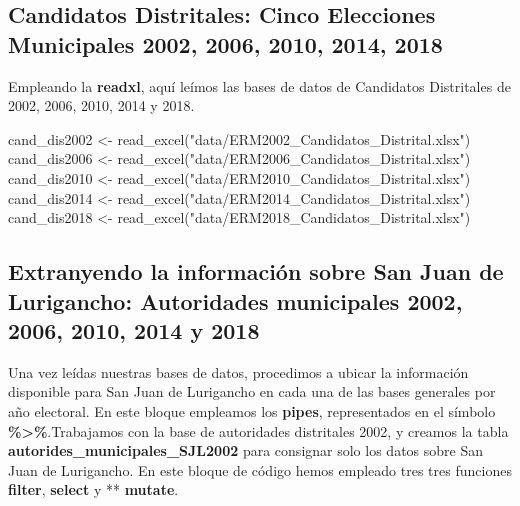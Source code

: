 \documentclass[
]{book}
\newenvironment{Shaded}{\begin{snugshade}}{\end{snugshade}}
\newcommand{\FunctionTok}[1]{\textcolor[rgb]{0.00,0.00,0.00}{#1}}
\newcommand{\NormalTok}[1]{#1}
\newcommand{\OtherTok}[1]{\textcolor[rgb]{0.56,0.35,0.01}{#1}}
\newcommand{\StringTok}[1]{\textcolor[rgb]{0.31,0.60,0.02}{#1}}
\begin{document}
\hypertarget{candidatos-distritales-cinco-elecciones-municipales-2002-2006-2010-2014-2018}{%
\subsection{Candidatos Distritales: Cinco Elecciones Municipales 2002, 2006, 2010, 2014, 2018}\label{candidatos-distritales-cinco-elecciones-municipales-2002-2006-2010-2014-2018}}

Empleando la \textbf{readxl}, aquí leímos las bases de datos de Candidatos Distritales de 2002, 2006, 2010, 2014 y 2018.

\begin{Shaded}
\begin{Highlighting}[]
\NormalTok{cand\_dis2002 }\OtherTok{\textless{}{-}} \FunctionTok{read\_excel}\NormalTok{(}\StringTok{"data/ERM2002\_Candidatos\_Distrital.xlsx"}\NormalTok{)}
\NormalTok{cand\_dis2006 }\OtherTok{\textless{}{-}} \FunctionTok{read\_excel}\NormalTok{(}\StringTok{"data/ERM2006\_Candidatos\_Distrital.xlsx"}\NormalTok{)}
\NormalTok{cand\_dis2010 }\OtherTok{\textless{}{-}} \FunctionTok{read\_excel}\NormalTok{(}\StringTok{"data/ERM2010\_Candidatos\_Distrital.xlsx"}\NormalTok{)}
\NormalTok{cand\_dis2014 }\OtherTok{\textless{}{-}} \FunctionTok{read\_excel}\NormalTok{(}\StringTok{"data/ERM2014\_Candidatos\_Distrital.xlsx"}\NormalTok{)}
\NormalTok{cand\_dis2018 }\OtherTok{\textless{}{-}} \FunctionTok{read\_excel}\NormalTok{(}\StringTok{"data/ERM2018\_Candidatos\_Distrital.xlsx"}\NormalTok{)}
\end{Highlighting}
\end{Shaded}

\hypertarget{extranyendo-la-informaciuxf3n-sobre-san-juan-de-lurigancho-autoridades-municipales-2002-2006-2010-2014-y-2018}{%
\subsection{Extranyendo la información sobre San Juan de Lurigancho: Autoridades municipales 2002, 2006, 2010, 2014 y 2018}\label{extranyendo-la-informaciuxf3n-sobre-san-juan-de-lurigancho-autoridades-municipales-2002-2006-2010-2014-y-2018}}

Una vez leídas nuestras bases de datos, procedimos a ubicar la información disponible para San Juan de Lurigancho en cada una de las bases generales por año electoral. En este bloque empleamos los \textbf{pipes}, representados en el símbolo \textbf{\%\textgreater\%}.Trabajamos con la base de autoridades distritales 2002, y creamos la tabla \textbf{autorides\_municipales\_SJL2002} para consignar solo los datos sobre San Juan de Lurigancho. En este bloque de código hemos empleado tres tres funciones \textbf{filter}, \textbf{select} y ** \textbf{mutate}.
\end{document}
